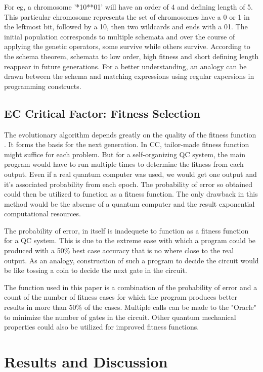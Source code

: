 \documentclass[conference]{IEEEtran}
\begin{document}
For eg, a chromosome '*10**01' will have an order of 4 and defining length of 5. This particular chromosome represents the set of chromosomes have a 0 or 1 in the leftmost bit, followed by a 10, then two wildcards and ends with a 01. The initial population corresponds to multiple schemata and over the course of applying the genetic operators, some survive while others survive. According to the schema theorem, schemata to low order, high fitness and short defining length reappear in future generations. For a better understanding, an analogy can be drawn between the schema and matching expressions using regular expersions in programming constructs.


\subsection{EC Critical Factor: Fitness Selection}
The evolutionary algorithm depends greatly on the quality of the fitness function \cite{haram}. It forms the basis for the next generation. In CC, tailor-made fitness function might suffice for each problem. But for a self-organizing QC system, the main program would have to run multiple times to determine the fitness from each output. Even if a real quantum computer was used, we would get one output and it's associated probability from each epoch. The probability of error so obtained could then be utilized to function as a fitness function. The only drawback in this method would be the absense of a quantum computer and the result exponential computational resources. 

The probability of error, in itself is inadequete to function as a fitness function for a QC system. This is due to the extreme ease with which a program could be produced with a 50\% best case accuracy that is no where close to the real output. As an analogy, construction of such a program to decide the circuit would be like tossing a coin to decide the next gate in the circuit. 

The function used in this paper is a combination of the probability of error and a count of the number of fitness cases for which the program produces better results in more than 50\% of the cases. Multiple calls can be made to the "Oracle" to minimize the number of gates in the circuit. Other quantum mechanical properties could also be utilized for improved fitness functions. 


\section{Results and Discussion}
\end{document}
